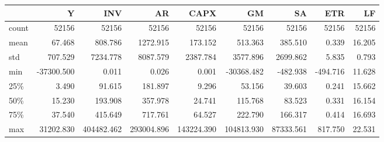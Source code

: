 \begin{tabular}{lrrrrrrrr}
\toprule
{} &        Y &         INV &          AR &        CAPX &          GM &         SA &        ETR &         LF \\
\midrule
count &  52156 &   52156 &   52156 &   52156 &   52156 &  52156 &  52156 &  52156 \\
mean  &     67.468 &     808.786 &    1272.915 &     173.152 &     513.363 &    385.510 &      0.339 &     16.205 \\
std   &    707.529 &    7234.778 &    8087.579 &    2387.784 &    3577.896 &   2699.862 &      5.835 &      0.793 \\
min   & -37300.500 &       0.011 &       0.026 &       0.001 &  -30368.482 &   -482.938 &   -494.716 &     11.628 \\
25\%   &      3.490 &      91.615 &     181.897 &       9.296 &      53.156 &     39.603 &      0.241 &     15.662 \\
50\%   &     15.230 &     193.908 &     357.978 &      24.741 &     115.768 &     83.523 &      0.331 &     16.154 \\
75\%   &     37.540 &     415.649 &     717.761 &      64.527 &     222.790 &    166.317 &      0.414 &     16.693 \\
max   &  31202.830 &  404482.462 &  293004.896 &  143224.390 &  104813.930 &  87333.561 &    817.750 &     22.531 \\
\bottomrule
\end{tabular}

